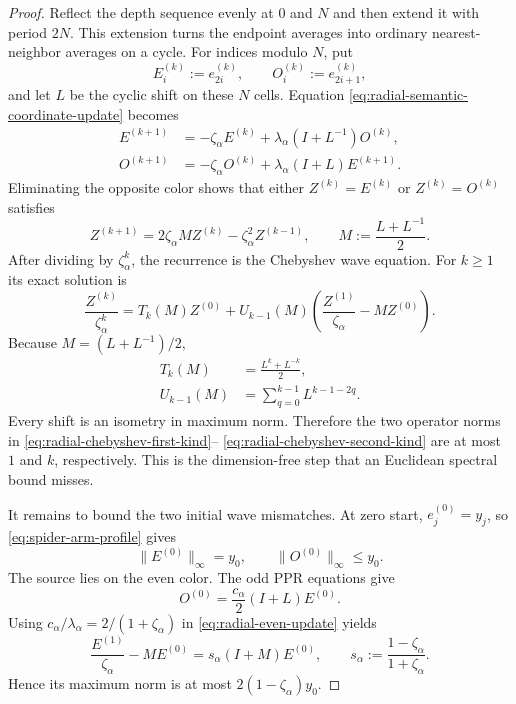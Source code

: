 \begin{proof}
Reflect the depth sequence evenly at $0$ and $N$ and then extend it with
period $2N$.  This extension turns the endpoint averages into ordinary
nearest-neighbor averages on a cycle.  For indices modulo $N$, put
\begin{equation*}
 E_i^{(k)}:=e_{2i}^{(k)},
 \qquad
 O_i^{(k)}:=e_{2i+1}^{(k)},
\end{equation*}
and let $L$ be the cyclic shift on these $N$ cells.  Equation
\eqref{eq:radial-semantic-coordinate-update} becomes
\begin{align}
 E^{(k+1)}
 &=-\zeta_\alpha E^{(k)}
   +\lambda_\alpha(I+L^{-1})O^{(k)},
 \label{eq:radial-even-update}\\
 O^{(k+1)}
 &=-\zeta_\alpha O^{(k)}
   +\lambda_\alpha(I+L)E^{(k+1)}.
 \label{eq:radial-odd-update}
\end{align}
Eliminating the opposite color shows that either
$Z^{(k)}=E^{(k)}$ or $Z^{(k)}=O^{(k)}$ satisfies
\begin{equation}
 Z^{(k+1)}
 =2\zeta_\alpha MZ^{(k)}
  -\zeta_\alpha^2Z^{(k-1)},
 \qquad
 M:=\frac{L+L^{-1}}2.
 \label{eq:radial-chebyshev-recurrence}
\end{equation}
After dividing by $\zeta_\alpha^k$, the recurrence is the Chebyshev wave
equation.  For $k\geq1$ its exact solution is
\begin{equation}
 \frac{Z^{(k)}}{\zeta_\alpha^k}
 =T_k(M)Z^{(0)}
 +U_{k-1}(M)
   \left(\frac{Z^{(1)}}{\zeta_\alpha}-MZ^{(0)}\right).
 \label{eq:radial-chebyshev-solution}
\end{equation}
Because $M=(L+L^{-1})/2$,
\begin{align}
 T_k(M)&=\frac{L^k+L^{-k}}2,
 \label{eq:radial-chebyshev-first-kind}\\
 U_{k-1}(M)&=
 \sum_{q=0}^{k-1}L^{k-1-2q}.
 \label{eq:radial-chebyshev-second-kind}
\end{align}
Every shift is an isometry in maximum norm.  Therefore the two operator norms
in \eqref{eq:radial-chebyshev-first-kind}--%
\eqref{eq:radial-chebyshev-second-kind} are at most $1$ and $k$,
respectively.  This is the dimension-free step that an Euclidean spectral
bound misses.

It remains to bound the two initial wave mismatches.  At zero start,
$e_j^{(0)}=y_j$, so \eqref{eq:spider-arm-profile} gives
\begin{equation}
 \|E^{(0)}\|_\infty=y_0,
 \qquad
 \|O^{(0)}\|_\infty\leq y_0.
 \label{eq:radial-initial-color-norms}
\end{equation}
The source lies on the even color.  The odd PPR equations give
\begin{equation*}
 O^{(0)}=\frac{c_\alpha}{2}(I+L)E^{(0)}.
\end{equation*}
Using $c_\alpha/\lambda_\alpha=2/(1+\zeta_\alpha)$ in
\eqref{eq:radial-even-update} yields
\begin{equation}
 \frac{E^{(1)}}{\zeta_\alpha}-ME^{(0)}
 =s_\alpha(I+M)E^{(0)},
 \qquad
 s_\alpha:=\frac{1-\zeta_\alpha}{1+\zeta_\alpha}.
 \label{eq:radial-even-wave-mismatch}
\end{equation}
Hence its maximum norm is at most
$2(1-\zeta_\alpha)y_0$.


\end{proof}
